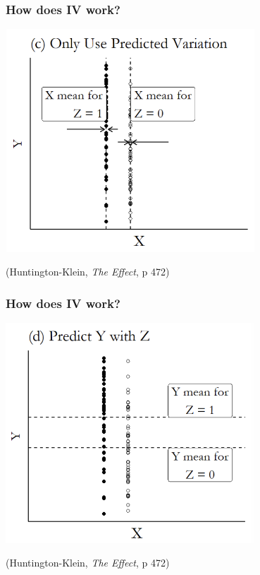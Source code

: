 \documentclass[aspectratio=43]{beamer}
\begin{document}
\begin{frame}
\frametitle{How does IV work?}
\centering

\includegraphics[width = 0.7\textwidth]{../img/ivlogic3}

{\scriptsize (Huntington-Klein, \textit{The Effect}, p 472)}
\end{frame}

\begin{frame}
\frametitle{How does IV work?}
\centering

\includegraphics[width = 0.7\textwidth]{../img/ivlogic4}

{\scriptsize (Huntington-Klein, \textit{The Effect}, p 472)}
\end{frame}
\end{document}
